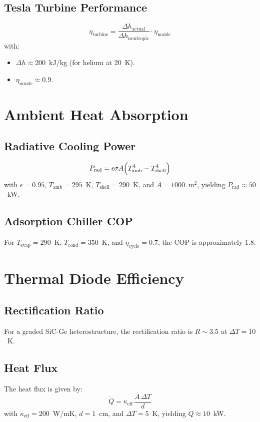 \documentclass[12pt]{article}
\begin{document}
\subsection{Tesla Turbine Performance}
\begin{equation}
    \eta_{\text{turbine}} = \frac{\Delta h_{\text{actual}}}{\Delta h_{\text{isentropic}}} \cdot \eta_{\text{nozzle}}
\end{equation}
with:
\begin{itemize}
    \item $\Delta h \approx 200$~kJ/kg (for helium at 20~K).
    \item $\eta_{\text{nozzle}} \approx 0.9$.
\end{itemize}

\section{Ambient Heat Absorption}
\subsection{Radiative Cooling Power}
\begin{equation}
    P_{\text{rad}} = \epsilon \sigma A \Bigl(T_{\text{amb}}^4 - T_{\text{shell}}^4\Bigr)
\end{equation}
with $\epsilon = 0.95$, $T_{\text{amb}} = 295$~K, $T_{\text{shell}} = 290$~K, and $A = 1000$~m$^2$, yielding $P_{\text{rad}} \approx 50$~kW.

\subsection{Adsorption Chiller COP}
For $T_{\text{evap}} = 290$~K, $T_{\text{cond}} = 350$~K, and $\eta_{\text{cycle}} = 0.7$, the COP is approximately 1.8.

\section{Thermal Diode Efficiency}
\subsection{Rectification Ratio}
For a graded SiC-Ge heterostructure, the rectification ratio is $R \sim 3.5$ at $\Delta T = 10$~K.

\subsection{Heat Flux}
The heat flux is given by:
\begin{equation}
    \dot{Q} = \kappa_{\text{eff}}\,\frac{A\,\Delta T}{d}
\end{equation}
with $\kappa_{\text{eff}} = 200$~W/mK, $d = 1$~cm, and $\Delta T = 5$~K, yielding $\dot{Q} \approx 10$~kW.
\end{document}
